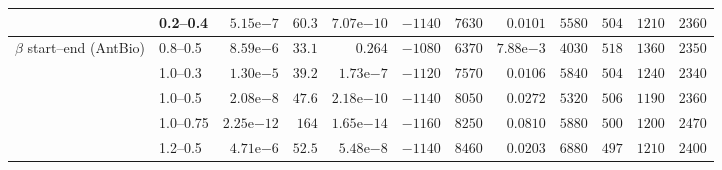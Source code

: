 \begin{tabular}{llrrrrrrrrrr}
 & 0.2--0.4 & $5.15\mathrm{e}{-7}$ & $60.3$ & $7.07\mathrm{e}{-10}$ & $-1140$ & $7630$ & $0.0101$ & $5580$ & $504$ & $1210$ & $2360$ \\
\midrule
$\beta$ start--end (AntBio) & 0.8--0.5 & $8.59\mathrm{e}{-6}$ & $33.1$ & $0.264$ & $-1080$ & $6370$ & $7.88\mathrm{e}{-3}$ & $4030$ & $518$ & $1360$ & $2350$ \\
 & 1.0--0.3 & $1.30\mathrm{e}{-5}$ & $39.2$ & $1.73\mathrm{e}{-7}$ & $-1120$ & $7570$ & $0.0106$ & $5840$ & $504$ & $1240$ & $2340$ \\
 & 1.0--0.5 & $2.08\mathrm{e}{-8}$ & $47.6$ & $2.18\mathrm{e}{-10}$ & $-1140$ & $8050$ & $0.0272$ & $5320$ & $506$ & $1190$ & $2360$ \\
 & 1.0--0.75 & $2.25\mathrm{e}{-12}$ & $164$ & $1.65\mathrm{e}{-14}$ & $-1160$ & $8250$ & $0.0810$ & $5880$ & $500$ & $1200$ & $2470$ \\
 & 1.2--0.5 & $4.71\mathrm{e}{-6}$ & $52.5$ & $5.48\mathrm{e}{-8}$ & $-1140$ & $8460$ & $0.0203$ & $6880$ & $497$ & $1210$ & $2400$ \\
\bottomrule
\end{tabular}
